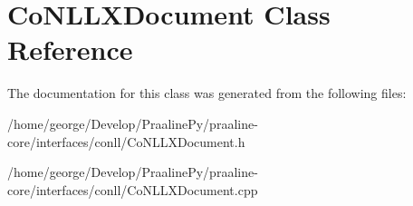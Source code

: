 \hypertarget{class_co_n_l_l_x_document}{}\section{Co\+N\+L\+L\+X\+Document Class Reference}
\label{class_co_n_l_l_x_document}


The documentation for this class was generated from the following files\+:\begin{DoxyCompactItemize}
\item 
/home/george/\+Develop/\+Praaline\+Py/praaline-\/core/interfaces/conll/Co\+N\+L\+L\+X\+Document.\+h\item 
/home/george/\+Develop/\+Praaline\+Py/praaline-\/core/interfaces/conll/Co\+N\+L\+L\+X\+Document.\+cpp\end{DoxyCompactItemize}
